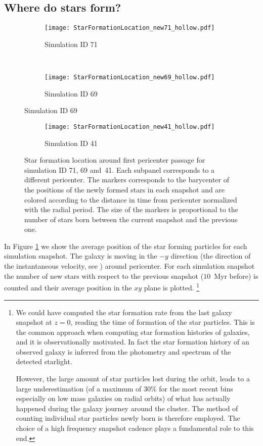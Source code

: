 \subsection{Where do stars form?}
\begin{figure}
\centering
\begin{subfigure}[t]{0.83\textwidth}
\centering
\caption{Simulation ID 71}
\texttt{[image: StarFormationLocation\_new71\_hollow.pdf]}
\end{subfigure}\\%
\begin{subfigure}[t]{0.83\textwidth}
\centering
\caption{Simulation ID 69}
\texttt{[image: StarFormationLocation\_new69\_hollow.pdf]}
\end{subfigure}
\label{fig:sf_location}
\end{figure}
\begin{figure}[ht]
\centering
\ContinuedFloat %
\begin{subfigure}{0.83\textwidth}
\caption{Simulation ID 41}
\texttt{[image: StarFormationLocation\_new41\_hollow.pdf]}
\end{subfigure}
\caption{Star formation location around first pericenter passage for simulation ID 71, 69 and~41.
Each subpanel corresponds to a different pericenter.
The markers corresponds to the barycenter of the positions of the newly formed stars in each snapshot and are colored according to the distance in time from pericenter normalized with the radial period.
The size of the markers is proportional to the number of stars born between the current snapshot and the previous one.}
\end{figure}
In Figure \ref{fig:sf_location} we show the average position of the star forming particles for each simulation snapshot.
The galaxy is moving in the $-y$ direction (the direction of the instantaneous velocity, see ) around pericenter.
For each simulation snapshot the number of new stars with respect to the previous snapshot ($10$~Myr before) is counted and their average position in the $xy$ plane is plotted.
\footnote{
We could have computed the star formation rate from the last galaxy snapshot at $z=0$, reading the time of formation of the star particles.
This is the common approach %
when computing star formation histories of galaxies, and it is observationally motivated.
In fact the star formation history of an observed galaxy is inferred from the photometry and spectrum of the detected starlight.

However, the large amount of star particles lost during the orbit, leads to a large underestimation (of a maximum of 30\% for the most recent bins especially on low mass galaxies on radial orbits) of what has actually happened during the galaxy journey around the cluster.
The method of counting individual star particles newly born is therefore employed.
The choice of a high frequency snapshot cadence plays a fundamental role to this end.
}
